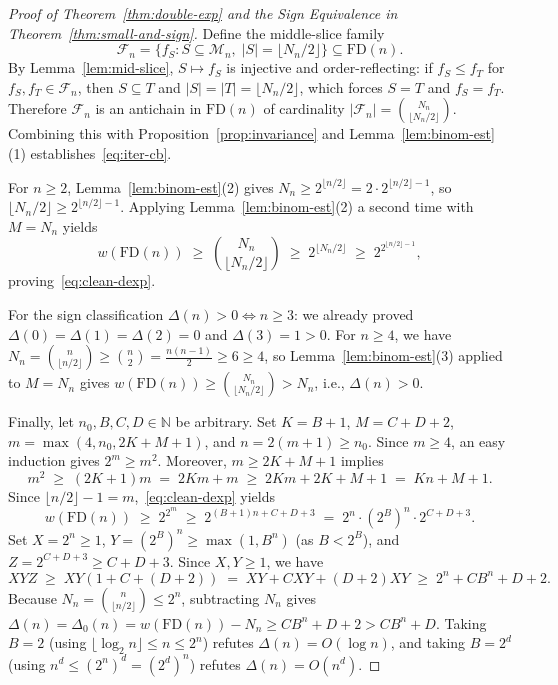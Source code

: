 \documentclass[11pt]{article}
\theoremstyle{definition}
\newcommand{\FD}{\mathrm{FD}}
\begin{document}
\begin{proof}[Proof of Theorem~\ref{thm:double-exp} and the Sign Equivalence in Theorem~\ref{thm:small-and-sign}]
Define the middle-slice family
\[
  \mathcal{F}_n = \bigl\{f_S : S \subseteq \mathcal{M}_n,\; |S| = \lfloor N_n / 2 \rfloor\bigr\} \subseteq \FD(n).
\]
By Lemma~\ref{lem:mid-slice}, $S \mapsto f_S$ is injective and order-reflecting: if $f_S \le f_T$ for $f_S, f_T \in \mathcal{F}_n$, then $S \subseteq T$ and $|S| = |T| = \lfloor N_n / 2 \rfloor$, which forces $S = T$ and $f_S = f_T$. Therefore $\mathcal{F}_n$ is an antichain in $\FD(n)$ of cardinality $|\mathcal{F}_n| = \binom{N_n}{\lfloor N_n / 2 \rfloor}$. Combining this with Proposition~\ref{prop:invariance} and Lemma~\ref{lem:binom-est}(1) establishes~\eqref{eq:iter-cb}.

For $n \ge 2$, Lemma~\ref{lem:binom-est}(2) gives $N_n \ge 2^{\lfloor n/2 \rfloor} = 2 \cdot 2^{\lfloor n/2 \rfloor - 1}$, so $\lfloor N_n / 2 \rfloor \ge 2^{\lfloor n/2 \rfloor - 1}$. Applying Lemma~\ref{lem:binom-est}(2) a second time with $M = N_n$ yields
\[
  w(\FD(n)) \;\ge\; \binom{N_n}{\lfloor N_n / 2 \rfloor} \;\ge\; 2^{\lfloor N_n / 2 \rfloor} \;\ge\; 2^{2^{\lfloor n/2 \rfloor - 1}},
\]
proving~\eqref{eq:clean-dexp}.

For the sign classification $\Delta(n) > 0 \iff n \ge 3$: we already proved $\Delta(0) = \Delta(1) = \Delta(2) = 0$ and $\Delta(3) = 1 > 0$. For $n \ge 4$, we have $N_n = \binom{n}{\lfloor n/2 \rfloor} \ge \binom{n}{2} = \frac{n(n - 1)}{2} \ge 6 \ge 4$, so Lemma~\ref{lem:binom-est}(3) applied to $M = N_n$ gives $w(\FD(n)) \ge \binom{N_n}{\lfloor N_n / 2 \rfloor} > N_n$, i.e., $\Delta(n) > 0$.

Finally, let $n_0, B, C, D \in \mathbb{N}$ be arbitrary. Set $K = B + 1$, $M = C + D + 2$, $m = \max(4, n_0, 2K + M + 1)$, and $n = 2(m + 1) \ge n_0$. Since $m \ge 4$, an easy induction gives $2^m \ge m^2$. Moreover, $m \ge 2K + M + 1$ implies
\[
  m^2 \;\ge\; (2K + 1)m \;=\; 2Km + m \;\ge\; 2Km + 2K + M + 1 \;=\; Kn + M + 1.
\]
Since $\lfloor n/2 \rfloor - 1 = m$,~\eqref{eq:clean-dexp} yields
\[
  w(\FD(n)) \;\ge\; 2^{2^m} \;\ge\; 2^{(B + 1)n + C + D + 3} \;=\; 2^n \cdot (2^B)^n \cdot 2^{C + D + 3}.
\]
Set $X = 2^n \ge 1$, $Y = (2^B)^n \ge \max(1, B^n)$ (as $B < 2^B$), and $Z = 2^{C + D + 3} \ge C + D + 3$. Since $X, Y \ge 1$, we have
\[
  X Y Z \;\ge\; X Y (1 + C + (D + 2)) \;=\; X Y + C X Y + (D + 2) X Y \;\ge\; 2^n + C B^n + D + 2.
\]
Because $N_n = \binom{n}{\lfloor n/2 \rfloor} \le 2^n$, subtracting $N_n$ gives $\Delta(n) = \Delta_0(n) = w(\FD(n)) - N_n \ge C B^n + D + 2 > C B^n + D$. Taking $B = 2$ (using $\lfloor \log_2 n \rfloor \le n \le 2^n$) refutes $\Delta(n) = O(\log n)$, and taking $B = 2^d$ (using $n^d \le (2^n)^d = (2^d)^n$) refutes $\Delta(n) = O(n^d)$.
\end{proof}
\end{document}
